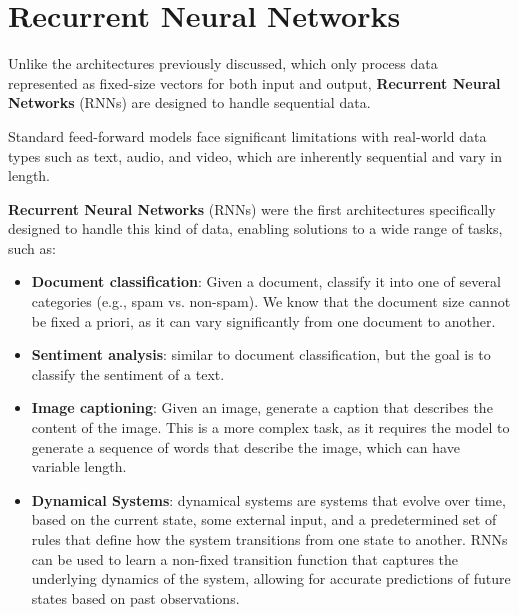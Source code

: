 \section{Recurrent Neural Networks}
Unlike the architectures previously discussed, which only process data represented as fixed-size vectors for both input and output, 
\textbf{Recurrent Neural Networks} (RNNs) are designed to handle sequential data. 

Standard feed-forward models face significant limitations with real-world data types such as text, audio, and video, which are inherently sequential and vary in length.

\textbf{Recurrent Neural Networks} (RNNs) were the first architectures specifically designed to handle
this kind of data, enabling solutions to a wide range of tasks, such as:
\begin{itemize}
    \item \textbf{Document classification}: Given a document, classify it into one of several categories (e.g., spam vs. non-spam).
    We know that the document size cannot be fixed a priori, as it can vary significantly from one document to another.
    \item \textbf{Sentiment analysis}: similar to document classification, but the goal is to classify the sentiment of a text.
    \item \textbf{Image captioning}: Given an image, generate a caption that describes the content of the image.
    This is a more complex task, as it requires the model to generate a sequence of words that describe the image, which can have variable length.
    \item \textbf{Dynamical Systems}: dynamical systems are systems that evolve over time, based on the current state, some external input,
    and a predetermined set of rules that define how the system transitions from one state to another.
    RNNs can be used to learn a non-fixed transition function that captures the underlying dynamics of the system, allowing for accurate predictions of future states based on past observations.
\end{itemize}

